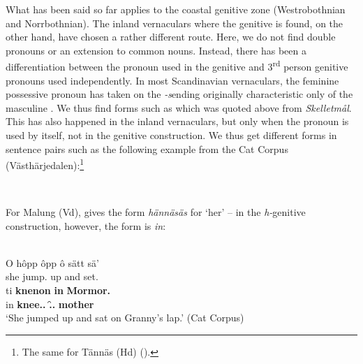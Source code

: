 What has been said so far applies to the coastal genitive zone (Westrobothnian and Norrbothnian). The inland vernaculars where the genitive is found, on the other hand, have chosen a rather different route. Here, we do not find double pronouns or an extension to common nouns. Instead, there has been a differentiation between the pronoun used in the genitive and 3\textsuperscript{rd} person genitive pronouns used independently. In most Scandinavian vernaculars, the feminine possessive pronoun has taken on the\textit{ {}-s}\textstyleLinguisticExample{ }ending originally characteristic only of the masculine . We thus find forms such as  which was quoted above from \textit{Skelletmål}. This has also happened in the inland vernaculars, but only when the pronoun is used by itself, not in the genitive construction. We thus get different forms in sentence pairs such as the following example from the Cat Corpus (Västhärjedalen):\footnote{ The same for Tännäs (Hd) (\citet[22]{Olofsson1999}).}

\ea\label{}
\\

\z 
\z

For Malung (Vd), \citet[2:211]{Levander1925} gives the form \textit{hännäsäs} for ‘her’ – in the \textit{h-}genitive construction, however, the form is \textit{in}: 


\ea\label{}
\\
\gll O  hôpp  ôpp  ô  sätt  sä’  \\
she  jump.{\pst}  up  and  set.{\pst}  {}  \\
\gll ti  \textbf{knenon} \textbf{in} \textbf{Mormor.}\\
in  \textbf{knee.{}.{\pl}} \textbf{{\pda}.{\f}.{\gen}} \textbf{mother}\\
\glt ‘She jumped up and sat on Granny’s lap.’ (Cat Corpus)
\z

